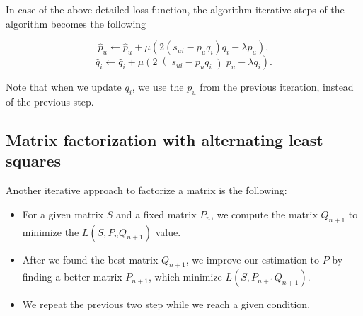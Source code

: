In case of the above detailed loss function, the algorithm iterative steps of the algorithm 
becomes the following

\[ \hat{p}_{u}\leftarrow \hat{p}_{u}+\mu \left(2\left(s_{ui}-p_u q_i\right) q_i - \lambda p_u\right),\]
\[\hat{q}_{i}\leftarrow \hat{q}_{i}+\mu \left(2\right(s_{ui}-p_u q_i\left)p_u - \lambda q_i\right) .\]

Note that when we update $q_i$, we use the $p_u$ from the previous iteration, instead of
the previous step.

\subsection{Matrix factorization with alternating least squares}
Another iterative approach to factorize a matrix is the following\cite{cichocki2007regularized}:
\begin{itemize}
\item For a given matrix $S$ and a fixed matrix $P_n$, we compute the matrix $Q_{n+1}$ to 
minimize the $L(S,P_n Q_{n+1})$ value.
\item  After we found the best matrix $Q_{n+1}$, we improve our estimation to
$P$ by finding a better matrix $P_{n+1}$, which minimize  $L(S,P_{n+1} Q_{n+1})$.
\item We repeat the previous two step while we reach a given condition. 
\end{itemize}

